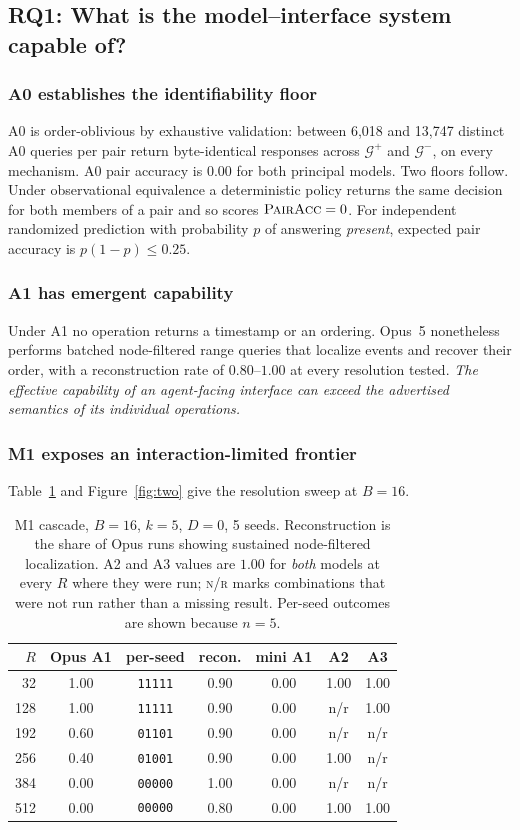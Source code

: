 \documentclass[sigconf,anonymous,review]{acmart}
\newcommand{\pairacc}{\textsc{PairAcc}}
\newcommand{\Gp}{\mathcal{G}^{+}}
\newcommand{\Gm}{\mathcal{G}^{-}}
\begin{document}
\subsection{RQ1: What is the model--interface system capable of?}

\subsubsection{A0 establishes the identifiability floor}
A0 is order-oblivious by exhaustive validation: between 6{,}018 and 13{,}747 distinct A0 queries
per pair return byte-identical responses across $\Gp$ and $\Gm$, on every mechanism. A0 pair
accuracy is $0.00$ for both principal models. Two floors follow. Under observational equivalence a
deterministic policy returns the same decision for both members of a pair and so scores
$\pairacc=0$. For independent randomized prediction with probability $p$ of answering
\emph{present}, expected pair accuracy is $p(1-p)\le0.25$.

\subsubsection{A1 has emergent capability}
Under A1 no operation returns a timestamp or an ordering. Opus~5 nonetheless performs batched
node-filtered range queries that localize events and recover their order, with a reconstruction
rate of $0.80$--$1.00$ at every resolution tested. \emph{The effective capability of an
agent-facing interface can exceed the advertised semantics of its individual operations.}

\subsubsection{M1 exposes an interaction-limited frontier}
Table~\ref{tab:m1} and Figure~\ref{fig:two} give the resolution sweep at $B{=}16$.

\begin{table}[t]
\caption{M1 cascade, $B{=}16$, $k{=}5$, $D{=}0$, 5 seeds. Reconstruction is the share of Opus runs
showing sustained node-filtered localization. A2 and A3 values are $1.00$ for \emph{both} models at every $R$ where they were run;
\textsc{n/r} marks combinations that were not run rather than a missing result. Per-seed outcomes
are shown because $n{=}5$.}
\label{tab:m1}
\small
\begin{tabular}{@{}rcccccc@{}}
\toprule
$R$ & Opus A1 & per-seed & recon. & mini A1 & A2 & A3 \\
\midrule
32  & 1.00 & \texttt{11111} & 0.90 & 0.00 & 1.00 & 1.00 \\
128 & 1.00 & \texttt{11111} & 0.90 & 0.00 & n/r  & 1.00 \\
192 & 0.60 & \texttt{01101} & 0.90 & 0.00 & n/r  & n/r \\
256 & 0.40 & \texttt{01001} & 0.90 & 0.00 & 1.00 & n/r \\
384 & 0.00 & \texttt{00000} & 1.00 & 0.00 & n/r  & n/r \\
512 & 0.00 & \texttt{00000} & 0.80 & 0.00 & 1.00 & 1.00 \\
\bottomrule
\end{tabular}
\end{table}
\end{document}
